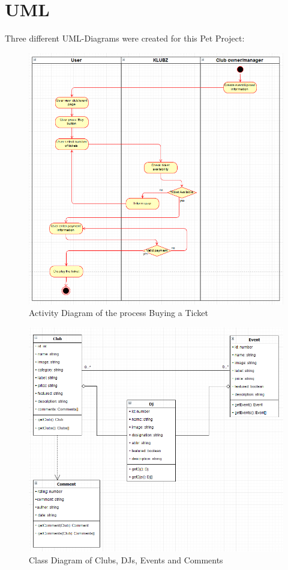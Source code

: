 \documentclass[12pt]{article}
\begin{document}
\section{UML}

Three different UML-Diagrams were created for this Pet Project:

\begin{figure}[H]
  \centering
    \includegraphics[width=1\textwidth]{figures/ActivityDiagram.png}
    \caption{Activity Diagram of the process Buying a Ticket}
\end{figure}

\begin{figure}[H]
  \centering
    \includegraphics[width=1\textwidth]{figures/ClassDiagram.png}
    \caption{Class Diagram of Clubs, DJs, Events and Comments}
\end{figure}
\end{document}
